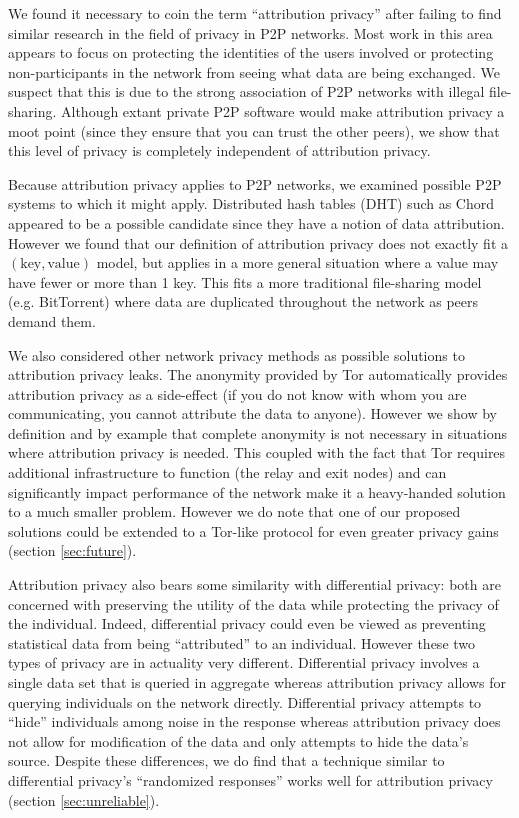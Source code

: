 \documentclass{article}
\newcommand{\secref}[1]{section \ref{sec:#1}}
\begin{document}
We found it necessary to coin the term ``attribution privacy'' after failing to
find similar research in the field of privacy in P2P networks. Most work in this
area appears to focus on protecting the identities of the users involved or
protecting non-participants in the network from seeing what data are being
exchanged\cite{privatep2p}. We suspect that this is due to the strong
association of P2P networks with illegal file-sharing. Although extant private
P2P software would make attribution privacy a moot point (since they ensure that
you can trust the other peers), we show that this level of privacy is
completely independent of attribution privacy.

Because attribution privacy applies to P2P networks, we examined possible P2P
systems to which it might apply. Distributed hash tables (DHT) such as
Chord\cite{chord} appeared to be a possible candidate since they have a notion
of data attribution. However we found that our definition of attribution privacy
does not exactly fit a $(\text{key},\text{value})$ model, but applies in a more
general situation where a value may have fewer or more than 1 key. This fits a
more traditional file-sharing model (e.g. BitTorrent) where data are duplicated
throughout the network as peers demand them.

We also considered other network privacy methods as possible solutions to
attribution privacy leaks. The anonymity provided by Tor
automatically provides attribution privacy as a side-effect (if you do not know
with whom you are communicating, you cannot attribute the data to anyone).
However we show by definition and by example that complete anonymity is not
necessary in situations where attribution privacy is needed. This coupled with
the fact that Tor requires additional infrastructure to function (the relay and
exit nodes) and can significantly impact performance of the network make it a
heavy-handed solution to a much smaller problem. However we do note that one of
our proposed solutions could be extended to a Tor-like protocol for even greater
privacy gains (\secref{future}).

Attribution privacy also bears some similarity with differential privacy: both
are concerned with preserving the utility of the data while protecting the
privacy of the individual. Indeed, differential privacy could even be viewed as
preventing statistical data from being ``attributed'' to an individual. However
these two types of privacy are in actuality very different. Differential
privacy involves a single data set that is queried in aggregate whereas attribution
privacy allows for querying individuals on the network directly. Differential
privacy attempts to ``hide'' individuals among noise in the response whereas
attribution privacy does not allow for modification of the data and only
attempts to hide the data's source. Despite these differences, we do find that a
technique similar to differential privacy's ``randomized
responses''\cite{randresps} works well
for attribution privacy (\secref{unreliable}).
\end{document}
